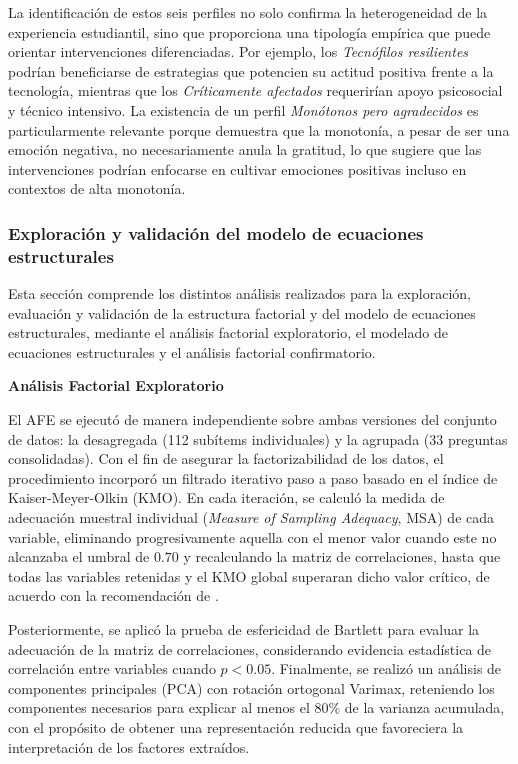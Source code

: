 \documentclass[conference]{IEEEtran}
\begin{document}
La identificación de estos seis perfiles no solo confirma la heterogeneidad de la experiencia estudiantil, sino que proporciona una tipología empírica que puede orientar intervenciones diferenciadas. Por ejemplo, los \textit{Tecnófilos resilientes} podrían beneficiarse de estrategias que potencien su actitud positiva frente a la tecnología, mientras que los \textit{Críticamente afectados} requerirían apoyo psicosocial y técnico intensivo. La existencia de un perfil \textit{Monótonos pero agradecidos} es particularmente relevante porque demuestra que la monotonía, a pesar de ser una emoción negativa, no necesariamente anula la gratitud, lo que sugiere que las intervenciones podrían enfocarse en cultivar emociones positivas incluso en contextos de alta monotonía.

\subsubsection{Exploración y validación del modelo de ecuaciones estructurales}

Esta sección comprende los distintos análisis realizados para la exploración, evaluación y validación de la estructura factorial y del modelo de ecuaciones estructurales, mediante el análisis factorial exploratorio, el modelado de ecuaciones estructurales y el análisis factorial confirmatorio.

\vspace{0.5em}
\noindent\textbf{Análisis Factorial Exploratorio}

El AFE se ejecutó de manera independiente sobre ambas versiones del conjunto de datos: la desagregada (112 subítems individuales) y la agrupada (33 preguntas consolidadas). Con el fin de asegurar la factorizabilidad de los datos, el procedimiento incorporó un filtrado iterativo paso a paso basado en el índice de Kaiser-Meyer-Olkin (KMO). En cada iteración, se calculó la medida de adecuación muestral individual (\textit{Measure of Sampling Adequacy}, MSA) de cada variable, eliminando progresivamente aquella con el menor valor cuando este no alcanzaba el umbral de $0.70$ y recalculando la matriz de correlaciones, hasta que todas las variables retenidas y el KMO global superaran dicho valor crítico, de acuerdo con la recomendación de \cite{kaiser1974index}.

Posteriormente, se aplicó la prueba de esfericidad de Bartlett para evaluar la adecuación de la matriz de correlaciones, considerando evidencia estadística de correlación entre variables cuando $p < 0.05$. Finalmente, se realizó un análisis de componentes principales (PCA) con rotación ortogonal Varimax, reteniendo los componentes necesarios para explicar al menos el 80\% de la varianza acumulada, con el propósito de obtener una representación reducida que favoreciera la interpretación de los factores extraídos.
\end{document}

